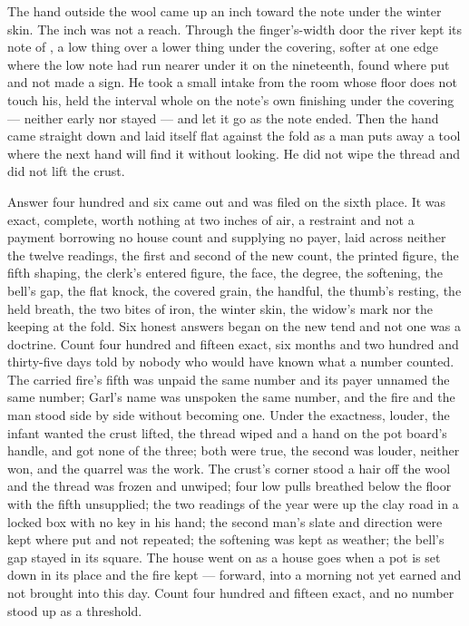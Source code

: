The hand outside the wool came up an inch toward the note under the winter skin. The inch was not a reach. Through the finger's-width door the river kept its note of , a low thing over a lower thing under the covering, softer at one edge where the low note had run nearer under it on the nineteenth, found where put and not made a sign. He took a small intake from the room whose floor does not touch his, held the interval whole on the note's own finishing under the covering --- neither early nor stayed --- and let it go as the note ended. Then the hand came straight down and laid itself flat against the fold as a man puts away a tool where the next hand will find it without looking. He did not wipe the thread and did not lift the crust.

Answer four hundred and six came out and was filed on the sixth place. It was exact, complete, worth nothing at two inches of air, a restraint and not a payment borrowing no house count and supplying no payer, laid across neither the twelve readings, the first and second of the new count, the printed figure, the fifth shaping, the clerk's entered figure, the face, the degree, the softening, the bell's gap, the flat knock, the covered grain, the handful, the thumb's resting, the held breath, the two bites of iron, the winter skin, the widow's mark nor the keeping at the fold. Six honest answers began on the new tend and not one was a doctrine. Count four hundred and fifteen exact, six months and two hundred and thirty-five days told by nobody who would have known what a number counted. The carried fire's fifth was unpaid the same number and its payer unnamed the same number; Garl's name was unspoken the same number, and the fire and the man stood side by side without becoming one. Under the exactness, louder, the infant wanted the crust lifted, the thread wiped and a hand on the pot board's handle, and got none of the three; both were true, the second was louder, neither won, and the quarrel was the work. The crust's corner stood a hair off the wool and the thread was frozen and unwiped; four low pulls breathed below the floor with the fifth unsupplied; the two readings of the year were up the clay road in a locked box with no key in his hand; the second man's slate and direction were kept where put and not repeated; the softening was kept as weather; the bell's gap stayed in its square. The house went on as a house goes when a pot is set down in its place and the fire kept --- forward, into a morning not yet earned and not brought into this day. Count four hundred and fifteen exact, and no number stood up as a threshold.
